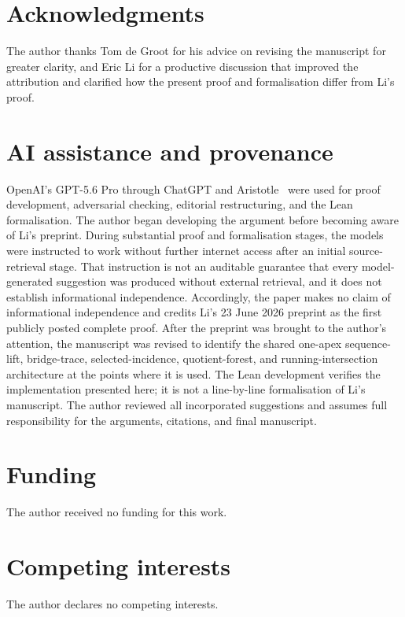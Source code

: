 \documentclass[a4paper,11pt,reqno]{amsart}
\theoremstyle{plain}
\theoremstyle{definition}
\theoremstyle{remark}
\begin{document}
\section*{Acknowledgments}

The author thanks Tom de Groot for his advice on revising the manuscript for
greater clarity, and Eric Li for a productive discussion that improved the
attribution and clarified how the present proof and formalisation differ from
Li's proof.

\section*{AI assistance and provenance}

OpenAI's GPT-5.6 Pro through ChatGPT and Aristotle~\citep{achim-et-al-2025}
were used for proof development, adversarial checking, editorial restructuring,
and the Lean formalisation.  The author began developing the argument before
becoming aware of Li's preprint.  During substantial proof and formalisation
stages, the models were instructed to work without further internet access
after an initial source-retrieval stage.  That instruction is not an auditable
guarantee that every model-generated suggestion was produced without external
retrieval, and it does not establish informational independence.  Accordingly,
the paper makes no claim of informational independence and credits Li's
23 June 2026 preprint as the first publicly posted complete proof.  After the
preprint was brought to the author's attention, the manuscript was revised to
identify the shared one-apex sequence-lift, bridge-trace, selected-incidence,
quotient-forest, and running-intersection architecture at the points where it
is used.  The Lean development verifies the implementation presented here;
it is not a line-by-line formalisation of Li's manuscript.  The author reviewed
all incorporated suggestions and assumes full responsibility for the
arguments, citations, and final manuscript.

\section*{Funding}
The author received no funding for this work.

\section*{Competing interests}
The author declares no competing interests.
\end{document}
